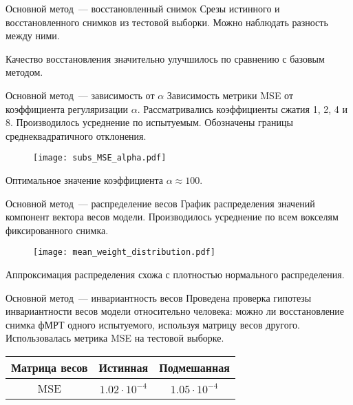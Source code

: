 \documentclass{beamer}
\begin{document}
\begin{frame}{Основной метод~--- восстановленный снимок}
    Срезы истинного и восстановленного снимков из тестовой выборки.
    Можно наблюдать разность между ними.
    \begin{figure}[h!]
		\centering
		\hfill
		\hfill
		\label{fig:4}
	\end{figure}
    Качество восстановления значительно улучшилось по сравнению с базовым методом.
\end{frame}
\begin{frame}{Основной метод~--- зависимость от $\alpha$}
    Зависимость метрики MSE от коэффициента регуляризации $\alpha$.
    Рассматривались коэффициенты сжатия 1, 2, 4 и 8.
    Производилось усреднение по испытуемым.
	Обозначены границы среднеквадратичного отклонения.
    \begin{figure}[h!]
		\centering
		\texttt{[image: subs\_MSE\_alpha.pdf]}
		\label{fig:5}
	\end{figure}
    Оптимальное значение коэффициента $\alpha \approx 100$.
\end{frame}
\begin{frame}{Основной метод~--- распределение весов}
    График распределения значений компонент вектора весов модели.
    Производилось усреднение по всем вокселям фиксированного снимка.
    \begin{figure}[h!]
		\centering
		\texttt{[image: mean\_weight\_distribution.pdf]}
		\label{fig:6}
	\end{figure}
    Аппроксимация распределения схожа с плотностью нормального распределения.
\end{frame}
\begin{frame}{Основной метод~--- инвариантность весов}
    Проведена проверка гипотезы инвариантности весов модели относительно человека:
	можно ли восстановление снимка фМРТ одного испытуемого, используя
	матрицу весов другого. Использовалась метрика MSE на тестовой выборке.
    \begin{table}[h!]
		\centering
		\begin{tabular}{|c|c|c|}
			\hline
			Матрица весов	&	Истинная	&	Подмешанная \\ \hline \hline
			MSE		& 	$1.02 \cdot 10^{-4}$	 &		$1.05 \cdot 10^{-4}$ \\ \hline
		\end{tabular}
		\label{table:1}
	\end{table}
\end{frame}
\end{document}
